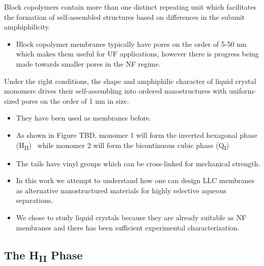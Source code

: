   Block copolymers contain more than one distinct repeating unit which facilitates 
  the formation of self-assembled structures based on differences in the subunit 
  amphiphilicity.~\cite{jackson_nanoporous_2010} 
  \begin{itemize}
    \item Block copolymer membranes typically have pores on the order of 5-50 nm which
    makes them useful for UF applications, however there is progress being made towards
    smaller pores in the NF regime.~\cite{gu_tailoring_2015}
  \end{itemize}
  
  Under the right conditions, the shape and amphiphilic character of liquid 
  crystal monomers drives their self-assembling into ordered nanostructures with
  uniform-sized pores on the order of 1 nm in size.~\cite{gin_polymerized_2008}
  \begin{itemize}
    \item They have been used as membranes before.~\cite{gin_polymerized_2001}
    \item As shown in Figure TBD, monomer 1 will form the inverted hexagonal phase 
    (H\textsubscript{II})~\cite{smith_ordered_1997} while monomer 2 will form the 
    bicontinuous cubic phase (Q\textsubscript{I})~\cite{carter_glycerol-based_2012}
    \item The tails have vinyl groups which can be cross-linked for mechanical strength.
    \item In this work we attempt to understand how one can design LLC membranes as 
    alternative nanostructured materials for highly selective aqueous separations.
    \item We chose to study liquid crystals because they are already suitable as NF 
    membranes and there has been sufficient experimental characterization.~\cite{gin_polymerized_2001,feng_scalable_2014,feng_thin_2016}
  \end{itemize}
   

  \subsection{The H\textsubscript{II} Phase}
   
